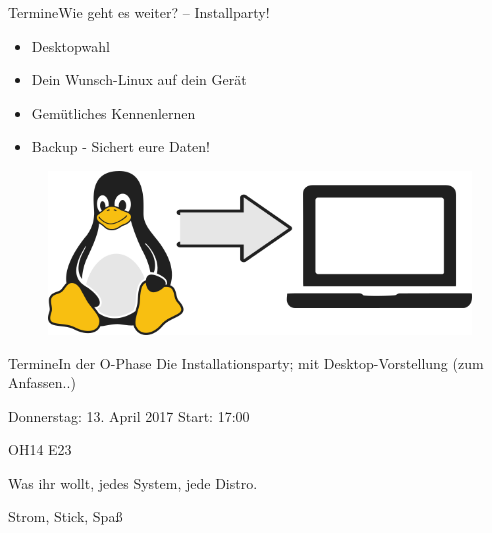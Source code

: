 % 

\begin{frame}{Termine}{Wie geht es weiter?  – Installparty!}
 \begin{itemize}
  \item Desktopwahl
  \item Dein Wunsch-Linux auf dein Gerät
  \item Gemütliches Kennenlernen
  \item Backup - Sichert eure Daten!
 \end{itemize}
 \begin{figure}
 \includegraphics[height=0.4\textheight]{resources/tux2laptop.png}
 \end{figure}
 
\end{frame}


\begin{frame}{Termine}{In der O-Phase}
	Die Installationsparty;
	mit Desktop-Vorstellung (zum Anfassen..)
	\begin{center}
	\begin{description}[<+->]
		\item[Wann?] Donnerstag: 13. April 2017 Start: 17:00
		\item[Wo?] OH14 E23
		\item[Was?] Was ihr wollt, jedes System, jede Distro.
		\item[Womit?] Strom, Stick, Spaß    
		
	\end{description}
	\end{center}
\begin{center}
\end{center}

\end{frame}


